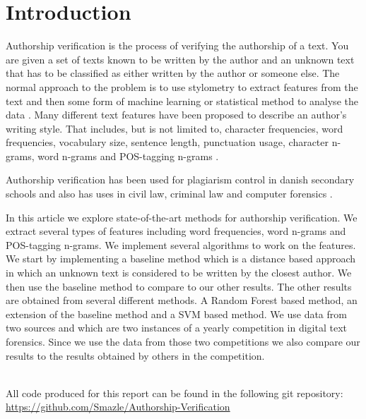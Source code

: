 \section{Introduction} \label{sec:introduction}
Authorship verification is the process of verifying the authorship of a text.
You are given a set of texts known to be written by the author and an unknown
text that has to be classified as either written by the author or someone else.
The normal approach to the problem is to use stylometry to extract features from
the text and then some form of machine learning or statistical method to analyse
the data \cite{stamatos2009}. Many different text features have been proposed
to describe an author's writing style. That includes, but is not limited to,
character frequencies, word frequencies, vocabulary size, sentence length,
punctuation usage, character n-grams, word n-grams and \gls{POS}-tagging n-grams
\cite{stamatos2009}.

Authorship verification has been used for plagiarism control in danish secondary
schools \cite{hansen2014} and also has uses in civil law, criminal law and
computer forensics \cite{stamatos2009}.

In this article we explore state-of-the-art methods for authorship verification.
We extract several types of features including word frequencies, word n-grams
and \gls{POS}-tagging n-grams. We implement several algorithms to work on the
features. We start by implementing a baseline method which is a distance based
approach in which an unknown text is considered to be written by the closest
author. We then use the baseline method to compare to our other results. The
other results are obtained from several different methods. A Random Forest based
method, an extension of the baseline method and a \gls{SVM} based method. We
use data from two sources \cite{pan:2015} and \cite{pan:2013} which are two
instances of a yearly competition in digital text forensics. Since we use the
data from those two competitions we also compare our results to the results
obtained by others in the competition.\\\\
\begin{center}
All code produced for this report can be found in the following git repository:
\url{https://github.com/Smazle/Authorship-Verification}
\end{center}
